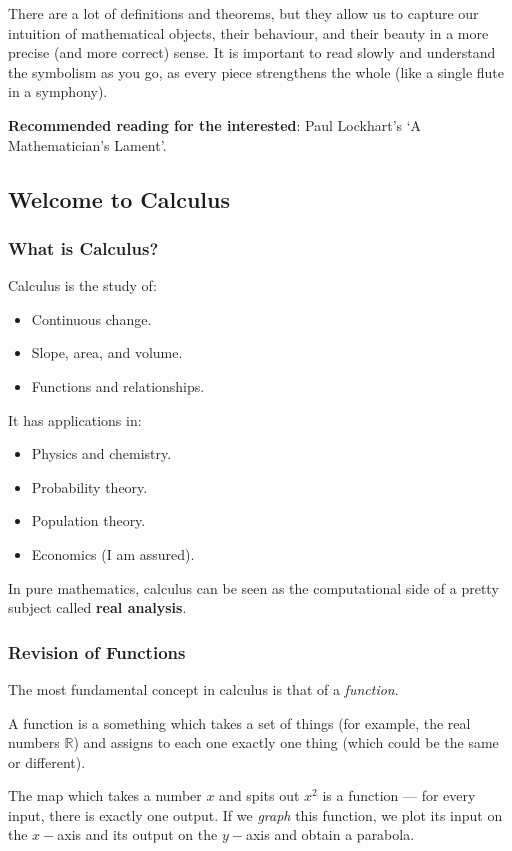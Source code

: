 There are a lot of definitions and theorems, but they allow us to capture our intuition of mathematical objects, their behaviour, and their beauty
in a more precise (and more correct) sense. It is important to read slowly and understand the symbolism as you go, as every piece strengthens the
whole (like a single flute in a symphony).

\textbf{Recommended reading for the interested}: Paul Lockhart's `A Mathematician's Lament'.

\clearpage
\subsection*{Welcome to Calculus}
\subsubsection* {What is Calculus?}
Calculus is the study of:
\begin{itemize}
  \item Continuous change.
  \item Slope, area, and volume.
  \item Functions and relationships.
\end{itemize}

It has applications in:
\begin{itemize}
  \item Physics and chemistry.
  \item Probability theory.
  \item Population theory.
  \item Economics (I am assured).
\end{itemize}

In pure mathematics, calculus can be seen as the computational side of a pretty
subject called \textbf{real analysis}.

\subsubsection*{Revision of Functions}
The most fundamental concept in calculus is that of a \textit{function}.

\begin{defn}[Function]
  A function is a something which takes a set of things (for example, the real numbers $ \mathbb{R} $) and assigns
  to each one exactly one thing (which could be the same or different).
\end{defn}

\begin{ex}
  The map which takes a number $ x $ and spits out $ x^2 $ is a function --- for every input, there is exactly one output. If
  we \textit{graph} this function, we plot its input on the $ x-$axis and its output on the $ y-$axis and obtain a parabola.
\end{ex}

